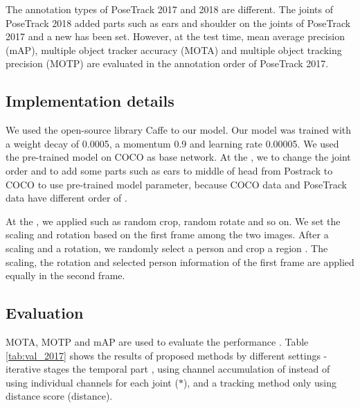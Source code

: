 \documentclass[conference]{IEEEtran}
\begin{document}
The annotation types of PoseTrack 2017 and 2018 are different. The joints of PoseTrack 2018 added  parts such as ears and shoulder on  the joints of PoseTrack 2017 and a new   has been set. 
However, at the test time, mean average precision (mAP), multiple object tracker accuracy (MOTA) and multiple object tracking precision (MOTP) are evaluated in the annotation order of PoseTrack 2017. 

\subsection{Implementation details}
We used the open-source library Caffe \cite{jia2014caffe} to  our model. Our model was trained with a weight decay of 0.0005, a momentum  0.9 and  learning rate  0.00005. We used the pre-trained model  on COCO  \cite{COCO} as  base network. At the , we  to change the joint order and to add some parts such as ears to middle of head from Postrack to COCO to use  pre-trained model parameter, because COCO data and PoseTrack data have different order of . 

At the , we applied  such as random crop, random rotate and so on. 
We set the scaling and rotation  based on the first frame among the two images. After a scaling and a rotation, we randomly select a person and crop a region . The scaling, the rotation and selected person information of the first frame are applied equally in the second frame. 








\subsection{Evaluation}

MOTA, MOTP and mAP are used to evaluate the performance \cite{milan2016mot16}. Table \ref{tab:val_2017} shows the results of  proposed methods by different settings -  iterative stages  the temporal part , using channel accumulation of 
instead of using individual channels for each joint ($*$), and a tracking method only using distance score  (distance). 
\end{document}
